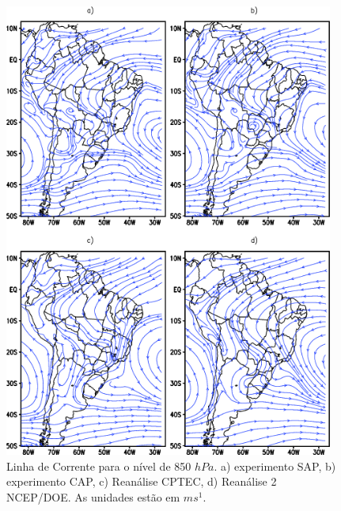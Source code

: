 \begin{figure}[!hbp]
\centering
\includegraphics[height=15cm]{./figs/media_corrente_anl_850hPa.png}
\caption{Linha de Corrente para o nível de 850 $hPa$. a) experimento SAP, b) experimento CAP, c) Reanálise CPTEC, d) Reanálise 2 NCEP/DOE. As unidades estão em $ms^{1}$.}
\label{fig10}
\end{figure}

